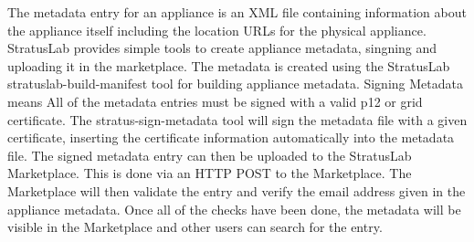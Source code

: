 The metadata entry for an appliance is an XML file containing
information about the appliance itself including the location URLs for
the physical appliance. StratusLab provides simple tools to create
appliance metadata, singning and uploading it in the marketplace.  The
metadata is created using the StratusLab stratuslab-build-manifest
tool for building appliance metadata.  Signing Metadata means All of
the metadata entries must be signed with a valid p12 or grid
certificate. The stratus-sign-metadata tool will sign the metadata
file with a given certificate, inserting the certificate information
automatically into the metadata file.  The signed metadata entry can
then be uploaded to the StratusLab Marketplace. This is done via an
HTTP POST to the Marketplace.  The Marketplace will then validate the
entry and verify the email address given in the appliance
metadata. Once all of the checks have been done, the metadata will be
visible in the Marketplace and other users can search for the entry.


